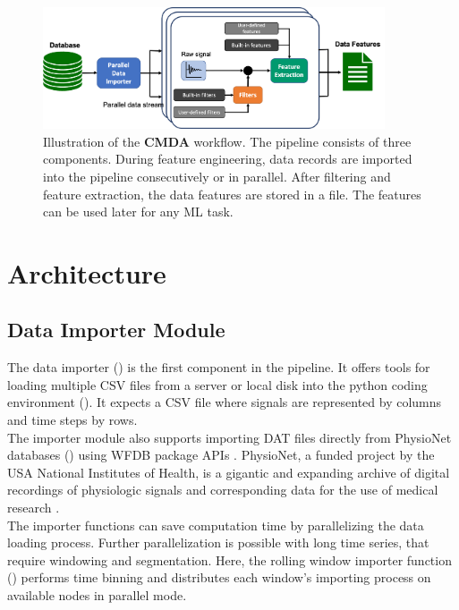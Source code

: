 \documentclass{article}
\begin{document}
\begin{figure}[h]
\includegraphics[width=0.9\textwidth]{workflow.png}
\centering
\caption{Illustration of the \textbf{CMDA} workflow. The pipeline consists of three components. During feature engineering, data records are imported into the pipeline consecutively or in parallel. After filtering and feature extraction, the data features are stored in a file. The features can be used later for any ML task.}
\label{fig:workflow}
\end{figure}



\section{Architecture}
\subsection{Data Importer Module}
The data importer () is the first component in the pipeline. It offers tools for loading multiple CSV files from a server or local disk into the python coding environment (). It expects a CSV file where signals are represented by columns and time steps by rows.\\
The importer module also supports importing DAT files directly from PhysioNet databases () using WFDB package APIs \cite{xie_chen_waveform_nodate}.
PhysioNet, a funded project by the USA National Institutes of Health, is a gigantic and expanding archive of digital recordings of physiologic signals and corresponding data for the use of medical research \cite{goldberger_physiobank_2000}.\\
The importer functions can save computation time by parallelizing the data loading process. 
Further parallelization is possible with long time series, that require windowing and segmentation.
Here, the rolling window importer function () performs time binning and distributes each window's importing process on available nodes in parallel mode.
\end{document}
